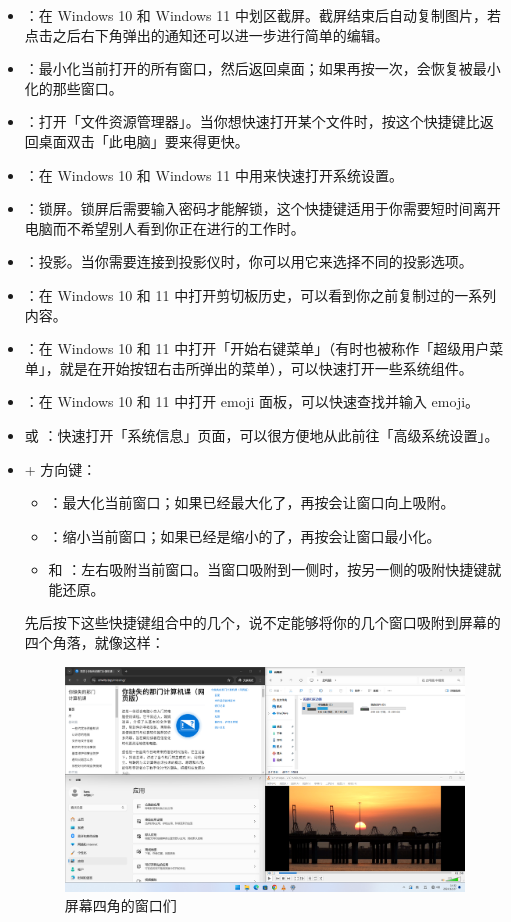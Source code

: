 \begin{itemize}
  \item {}：在 Windows 10 和 Windows 11 中划区截屏。截屏结束后自动复制图片，若点击之后右下角弹出的通知还可以进一步进行简单的编辑。
  \item {}：最小化当前打开的所有窗口，然后返回桌面；如果再按一次，会恢复被最小化的那些窗口。
  \item {}：打开「文件资源管理器」。当你想快速打开某个文件时，按这个快捷键比返回桌面双击「此电脑」要来得更快。
  \item {}：在 Windows 10 和 Windows 11 中用来快速打开系统设置。
  \item {}：锁屏。锁屏后需要输入密码才能解锁，这个快捷键适用于你需要短时间离开电脑而不希望别人看到你正在进行的工作时。
  \item {}：投影。当你需要连接到投影仪时，你可以用它来选择不同的投影选项。
  \item {}：在 Windows 10 和 11 中打开剪切板历史，可以看到你之前复制过的一系列内容。
  \item {}：在 Windows 10 和 11 中打开「开始右键菜单」（有时也被称作「超级用户菜单」，就是在开始按钮右击所弹出的菜单），可以快速打开一些系统组件。
  \item \keys{\Windows + ;}：在 Windows 10 和 11 中打开 emoji 面板，可以快速查找并输入 emoji。
  \item {} 或 ：快速打开「系统信息」页面，可以很方便地从此前往「高级系统设置」。
  \item \keys{\Windows} + 方向键：
  \begin{itemize}
    \item {}：最大化当前窗口；如果已经最大化了，再按会让窗口向上吸附。
    \item {}：缩小当前窗口；如果已经是缩小的了，再按会让窗口最小化。
    \item {} 和 ：左右吸附当前窗口。当窗口吸附到一侧时，按另一侧的吸附快捷键就能还原。
  \end{itemize}

  先后按下这些快捷键组合中的几个，说不定能够将你的几个窗口吸附到屏幕的四个角落，就像这样：

  \begin{figure}[htb!]
    \centering
    \includegraphics[width=.7\textwidth]{assets/basic/Window_Grid.png}
    \caption{屏幕四角的窗口们}
    \label{fig:Window_Grid}
  \end{figure}


\end{itemize}

